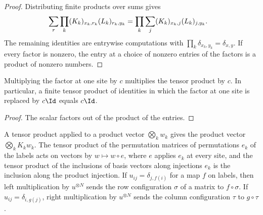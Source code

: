 \begin{proof}
    \leanok
    Distributing finite products over sums gives
    \begin{align}
        \sum_{r}\prod_k(K_k)_{x_k,r_k}(L_k)_{r_k,y_k}
         & =\prod_k\sum_{j}(K_k)_{x_k,j}(L_k)_{j,y_k}.
        \notag
    \end{align}
    The remaining identities are entrywise computations with
    $\prod_k\delta_{x_k,y_k}=\delta_{x,y}$. If every factor is nonzero, the
    entry at a choice of nonzero entries of the factors is a product of
    nonzero numbers.
\end{proof}

\begin{lemma}
    \label{lem:elementary_finite_tensor_scalar_site}
    \leanok
    Multiplying the factor at one site by $c$ multiplies the tensor product
    by $c$. In particular, a finite tensor product of identities in which the
    factor at one site is replaced by $c\Id$ equals $c\Id$.
\end{lemma}

\begin{proof}
    \leanok
    The scalar factors out of the product of the entries.
\end{proof}

\begin{lemma}
    \label{lem:elementary_tensor_power_label_map}
    \leanok
    A tensor product applied to a product vector $\bigotimes_kw_k$ gives the
    product vector $\bigotimes_kK_kw_k$. The tensor product of the permutation
    matrices of permutations $e_k$ of the labels acts on vectors by
    $w\mapsto w\circ e$, where $e$ applies $e_k$ at every site, and the tensor
    product of the inclusions of basis vectors along injections $e_k$ is the
    inclusion along the product injection. If $u_{ij}=\delta_{j,f(i)}$ for a
    map $f$ on labels, then left multiplication by $u^{\otimes N}$ sends the
    row configuration $\sigma$ of a matrix to $f\circ\sigma$. If
    $u_{ij}=\delta_{i,g(j)}$, right multiplication by $u^{\otimes N}$ sends
    the column configuration $\tau$ to $g\circ\tau$.
\end{lemma}

